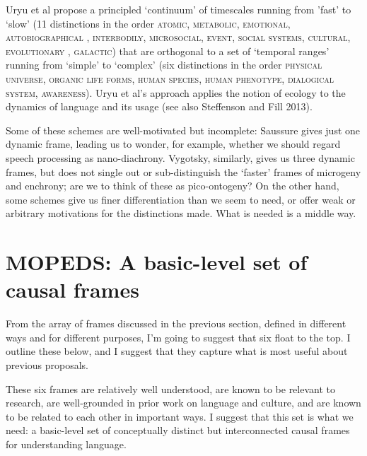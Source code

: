 Uryu et al propose a principled \textquoteleft continuum' of timescales running from 
'fast' to \textquoteleft slow' (11 distinctions in the order \textsc{atomic}, 
\textsc{metabolic}, \textsc{emotional}, \textsc{autobiographical
}, \textsc{interbodily}, \textsc{microsocial}, \textsc{event}, 
\textsc{social systems}, \textsc{cultural}, \textsc{evolutionary
}, \textsc{galactic}) that are orthogonal to a set of \textquoteleft temporal 
ranges' running from \textquoteleft simple' to \textquoteleft complex' (six distinctions in the 
order \textsc{physical universe}, \textsc{organic life forms}, 
\textsc{human species}, \textsc{human phenotype}, \textsc{
dialogical system}, \textsc{awareness}). Uryu et al's approach 
applies the notion of ecology to the dynamics of language and its usage 
(see also Steffenson and Fill 2013).



Some of these schemes are well-motivated but incomplete: Saussure gives 
just one dynamic frame, leading us to wonder, for example, whether we 
should regard speech processing as nano-diachrony. Vygotsky, similarly, 
gives us three dynamic frames, but does not single out or 
sub-distinguish the \textquoteleft faster' frames of microgeny and enchrony; are we to 
think of these as pico-ontogeny? On the other hand, some schemes give us 
finer differentiation than we seem to need, or offer weak or arbitrary 
motivations for the distinctions made. What is needed is a middle way. 



\section{MOPEDS: A basic-level set of causal 
frames}


From the array of frames discussed in the previous section, defined in 
different ways and for different purposes, I'm going to suggest that six 
float to the top. I outline these below, and I suggest that they capture 
what is most useful about previous proposals. 



These six frames are relatively well understood, are known to be 
relevant to research, are well-grounded in prior work on language and 
culture, and are known to be related to each other in important ways. I 
suggest that this set is what we need: a basic-level set of conceptually 
distinct but interconnected causal frames for understanding language. 



